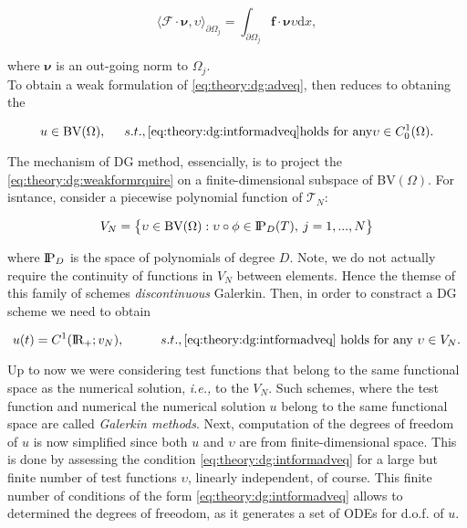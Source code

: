 \documentclass[11pt,a4paper,headinclude=true,DIV=14,BCOR=8mm,chapterprefix,listof=totoc,twoside,openright,abstracton]{scrbook}
\begin{document}
\begin{equation}
    \langle\boldsymbol{\mathcal{F}}\cdot\boldsymbol{\nu},\upsilon\rangle_{\partial\Omega_j} = \int_{\partial\Omega_j}\boldsymbol{f}\cdot\boldsymbol{\nu}\upsilon\text{d}x,
\end{equation}

where $\boldsymbol{\nu}$ is an out-going norm to $\Omega_j$. \\
To obtain a weak formulation of \ref{eq:theory:dg:adveq}, then reduces to obtaning the 

\begin{equation}
    u\in\text{BV}(\Omega), \hspace{5mm} s.t., \ref{eq:theory:dg:intformadveq} \text{holds for any} \upsilon \in C_0 ^1(\Omega).
    \label{eq:theory:dg:weakformrquire}
\end{equation}

The mechanism of DG method, essencially, is to project the \ref{eq:theory:dg:weakformrquire} on a finite-dimensional subspace of BV$(\Omega)$. For isntance, consider a piecewise polynomial function of $\mathcal{T}_{N}$:

\begin{equation}
    V_N = \big\{ \upsilon\in\text{BV}(\Omega):\upsilon\circ\phi\in\text{I\!P}_{D}(T), \: j=1,...,N \big\}
\end{equation}

where $\text{I\!P}_{D}$ is the space of polynomials of degree $D$. Note, we do not actually require the continuity of functions in $V_N$ between elements. Hence the themse of this family of schemes \textit{discontinuous} Galerkin. Then, in order to constract a DG scheme we need to obtain

\begin{equation}
    u(t) = C^1(\text{I\!R}_{+};v_N), \hspace{10mm} s.t., \ref{eq:theory:dg:intformadveq} \text{ holds for any } \upsilon\in V_N.
    \label{eq:theory:dg:weakform}
\end{equation}

Up to now we were considering test functions that belong to the same functional space as the numerical solution, \textit{i.e.,} to the $V_N$. Such schemes, where the test function and numerical the numerical solution $u$ belong to the same functional space are called \textit{Galerkin methods}. Next, computation of the degrees of freedom of $u$ is now simplified since both $u$ and $\upsilon$ are from finite-dimensional space. This is done by assessing the condition \ref{eq:theory:dg:intformadveq} for a large but finite number of test functions $\upsilon$, linearly independent, of course. This finite number of conditions of the form \ref{eq:theory:dg:intformadveq} allows to determined the degrees of freeodom, as it generates a set of ODEs for d.o.f. of $u$. \\
\end{document}
